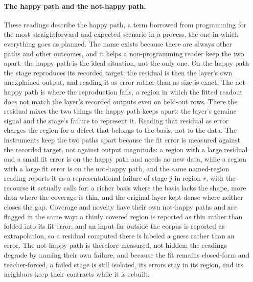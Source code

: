 \documentclass[11pt]{article}
\begin{document}
\paragraph{The happy path and the not-happy path.}
These readings describe the happy path, a term borrowed from
programming for the most straightforward and expected scenario
in a process, the one in which everything goes as planned. The
name exists because there are always other paths and other
outcomes, and it helps a non-programming reader keep the two
apart: the happy path is the ideal situation, not the only
one. On the happy path the stage reproduces its recorded
target: the residual is then the layer's own unexplained
output, and reading it as error rather than as size is exact.
The not-happy path is where the
reproduction fails, a region in which the fitted readout does
not match the layer's recorded outputs even on held-out rows.
There the residual mixes the two things the happy path keeps
apart: the layer's genuine signal and the stage's failure to
represent it. Reading that residual as error charges the region
for a defect that belongs to the basis, not to the data. The
instruments keep the two paths apart because the fit error is
measured against the recorded target, not against output
magnitude: a region with a large residual and a small fit error
is on the happy path and needs no new data, while a region with
a large fit error is on the not-happy path, and the same
named-region reading reports it as a representational failure of
stage $j$ in region $r$, with the recourse it actually calls
for: a richer basis where the basis lacks the shape, more data
where the coverage is thin, and the original layer kept dense
where neither closes the gap. Coverage and novelty have their
own not-happy paths and are flagged in the same way: a thinly
covered region is reported as thin rather than folded into its
fit error, and an input far outside the corpus is reported as
extrapolation, so a residual computed there is labeled a guess
rather than an error. The not-happy path is therefore measured,
not hidden: the readings degrade by naming their own failure,
and because the fit remains closed-form and teacher-forced, a
failed stage is still isolated, its errors stay in its region,
and its neighbors keep their contracts while it is rebuilt.
\end{document}
